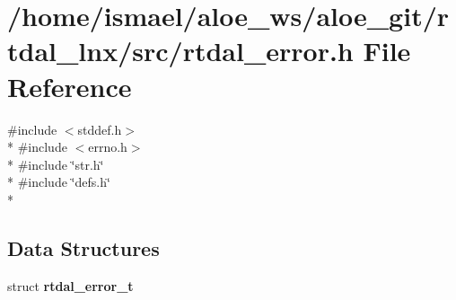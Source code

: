 \section{/home/ismael/aloe\-\_\-ws/aloe\-\_\-git/rtdal\-\_\-lnx/src/rtdal\-\_\-error.h File Reference}
\label{rtdal__error_8h}
{\ttfamily \#include $<$stddef.\-h$>$}\\*
{\ttfamily \#include $<$errno.\-h$>$}\\*
{\ttfamily \#include \char`\"{}str.\-h\char`\"{}}\\*
{\ttfamily \#include \char`\"{}defs.\-h\char`\"{}}\\*
\subsection*{Data Structures}
\begin{DoxyCompactItemize}
\item 
struct {\bf rtdal\-\_\-error\-\_\-t}
\end{DoxyCompactItemize}
